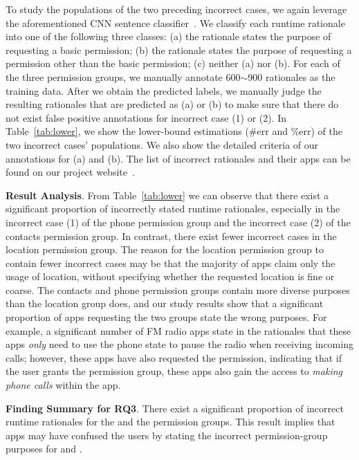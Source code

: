 To study the populations of the two preceding incorrect cases, we again leverage the aforementioned CNN sentence classifier~\cite{cnn}. 
We classify each runtime rationale into one of the following three classes: 
(a) the rationale states the purpose of requesting a basic permission; 
(b) the rationale states the purpose of requesting a permission other than the basic permission; (c) neither (a) nor (b). 
For each of the three permission groups, we manually annotate 600$\sim$900 rationales as the training data. 
After we obtain the predicted labels, we manually judge the resulting rationales that are predicted as (a) or (b) to make sure that there do not exist false positive annotations for incorrect case (1) or (2). 
In Table~\ref{tab:lower}, we show the lower-bound estimations (\textsf{\#err} and \textsf{\%err}) of the two incorrect cases' populations. 
We also show the detailed criteria of our annotations for (a) and (b). 
The list of incorrect rationales and their apps can be found on our project website~\cite{runtimeproj}.

{\bf Result Analysis}. From Table~\ref{tab:lower} we can observe that there exist a significant proportion of incorrectly stated runtime rationales, especially in the incorrect case (1) of the phone permission group and the incorrect case (2) of the contacts permission group. 
In contrast, there exist fewer incorrect cases in the location permission group.
The reason for the location permission group to contain fewer incorrect cases may be that the majority of apps claim only the usage of location, without specifying whether the requested location is fine or coarse. 
The contacts and phone permission groups contain more diverse purposes than the location group does, and our study results show that a significant proportion of apps requesting the two groups state the wrong purposes. 
For example, a significant number of FM radio apps state in the rationales that these apps \emph{only} need to use the phone state to pause the radio when receiving incoming calls;  
however, these apps have also requested the  permission, indicating that if the user grants the permission group, these apps also gain the access to \emph{making phone calls} within the app. 

{\bf Finding Summary for RQ3}. There exist a significant proportion of incorrect runtime rationales for the  and the  permission groups. This result implies that apps may have confused the users by stating the incorrect permission-group purposes for  and . 

